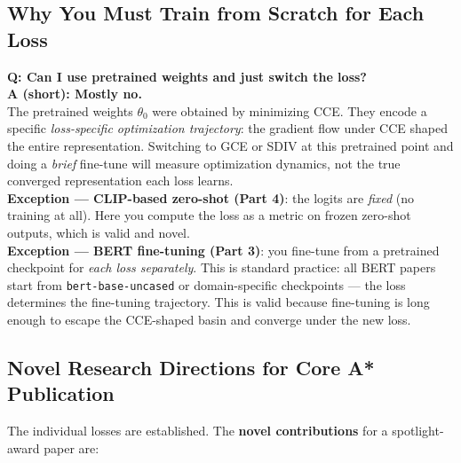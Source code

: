 \documentclass[11pt,a4paper]{article}
\begin{document}
\subsection{Why You Must Train from Scratch for Each Loss}

\begin{tcolorbox}[colback=yellow!5!white,colframe=orange!80!black,title=Key Question Answered]
\textbf{Q: Can I use pretrained weights and just switch the loss?}\\[4pt]
\textbf{A (short): Mostly no.}\\[4pt]
The pretrained weights $\theta_0$ were obtained by minimizing CCE. They encode a specific
\emph{loss-specific optimization trajectory}: the gradient flow under CCE shaped the entire
representation. Switching to GCE or SDIV at this pretrained point and doing a \emph{brief}
fine-tune will measure optimization dynamics, not the true converged representation each
loss learns.\\[4pt]
\textbf{Exception — CLIP-based zero-shot (Part 4)}: the logits are \emph{fixed} (no training
at all). Here you compute the loss as a metric on frozen zero-shot outputs, which is valid
and novel.\\[4pt]
\textbf{Exception — BERT fine-tuning (Part 3)}: you fine-tune from a pretrained checkpoint
for \emph{each loss separately}. This is standard practice: all BERT papers start from
\texttt{bert-base-uncased} or domain-specific checkpoints — the loss determines the
fine-tuning trajectory. This is valid because fine-tuning is long enough to escape the
CCE-shaped basin and converge under the new loss.
\end{tcolorbox}

\subsection{Novel Research Directions for Core A* Publication}

The individual losses are established. The \textbf{novel contributions} for a spotlight-award
paper are:
\end{document}

